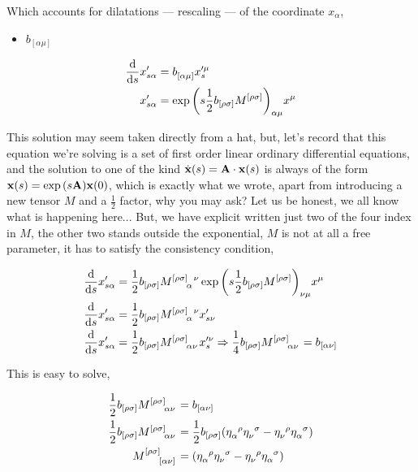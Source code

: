 Which accounts for dilatations --- rescaling --- of the coordinate $x_\alpha$,

\begin{itemize}
    \item $b_{[\alpha\mu]}$
\end{itemize}

\begin{align*}
    \dv{}{s}x'_{s\alpha}&=\tensor{b}{_{[\alpha}_{\mu]}}x'^\mu_s\\
    x'_{s\alpha}&=\tensor{\exp\qty(s\frac12b_{[\rho\sigma]}\tensor{M}{^{[\rho}^{\sigma]}})}{_\alpha_\mu}x^\mu
\end{align*}

This solution may seem taken directly from a hat, but, let's record that this equation we're solving is a set of first order linear ordinary differential equations, 
and the solution to one of the kind $\dot{\vb x}\qty(s)=\vb A\cdot \vb x\qty(s)$ is always of the form $\vb x\qty(s)=\exp\qty(s\vb A)\vb x\qty(0)$, which is exactly what we wrote, apart 
from introducing a new tensor $M$ and a $\frac12$ factor, why you may ask? Let us be honest, we all know what is happening here... But, we have explicit written just two of the four index in $M$, the other two 
stands outside the exponential, $M$ is not at all a free parameter, it has to satisfy the consistency condition, 

\begin{align*}
    \dv{}{s}x'_{s\alpha}&=\frac12b_{[\rho\sigma]}\tensor{M}{^{[\rho}^{\sigma]}_\alpha^\nu}\tensor{\exp\qty(s\frac12b_{[\rho\sigma]}\tensor{M}{^{[\rho}^{\sigma]}})}{_\nu_\mu}x^\mu\\
    \dv{}{s}x'_{s\alpha}&=\frac12b_{[\rho\sigma]}\tensor{M}{^{[\rho}^{\sigma]}_\alpha^\nu}x'_{s\nu}\\
    \dv{}{s}x'_{s\alpha}&=\frac12b_{[\rho\sigma]}\tensor{M}{^{[\rho}^{\sigma]}_\alpha_\nu}x'^\nu_{s}\Rightarrow \frac14b_{[\rho\sigma]}\tensor{M}{^{[\rho}^{\sigma]}_\alpha_\nu}=b_{[\alpha\nu]}
\end{align*}

This is easy to solve,

\begin{align*}
    \frac12b_{[\rho\sigma]}\tensor{M}{^{[\rho}^{\sigma]}_\alpha_\nu}&=b_{[\alpha\nu]}\\
    \frac12b_{[\rho\sigma]}\tensor{M}{^{[\rho}^{\sigma]}_\alpha_\nu}&=\frac12b_{[\rho\sigma]}\qty(\tensor{\eta}{_\alpha^\rho}\tensor{\eta}{_\nu^\sigma}-\tensor{\eta}{_\nu^\rho}\tensor{\eta}{_\alpha^\sigma})\\
    \tensor{M}{^{[\rho}^{\sigma]}_{[\alpha}_{\nu]}}&=\qty(\tensor{\eta}{_\alpha^\rho}\tensor{\eta}{_\nu^\sigma}-\tensor{\eta}{_\nu^\rho}\tensor{\eta}{_\alpha^\sigma})
\end{align*}

